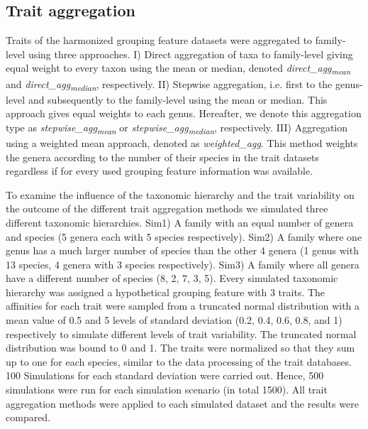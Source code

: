 \documentclass{article}
\begin{document}
\newpage

\subsection*{Trait aggregation}

Traits of the harmonized grouping feature datasets were aggregated to family-level using three approaches. I) Direct aggregation of taxa to family-level giving equal weight to every taxon using the mean or median, denoted \textit{direct\_agg\textsubscript{mean}} and \textit{direct\_agg\textsubscript{median}}, respectively. II) Stepwise aggregation, i.e. first to the genus-level and subsequently to the family-level using the mean or median. This approach gives equal weights to each genus. Hereafter, we denote this aggregation type as \textit{stepwise\_agg\textsubscript{mean}} or \textit{stepwise\_agg\textsubscript{median}}, respectively. III) Aggregation using a weighted mean approach, denoted as \textit{weighted\_agg}. This method weights the genera according to the number of their species in the trait datasets regardless if for every used grouping feature information was available. 

To examine the influence of the taxonomic hierarchy and the trait variability on the outcome of the different trait aggregation methods we simulated three different taxonomic hierarchies. 
Sim1) A family with an equal number of genera and species (5 genera each with 5 species respectively).
Sim2) A family where one genus has a much larger number of species than the other 4 genera (1 genus with 13 species, 4 genera with 3 species respectively). 
Sim3) A family where all genera have a different number of species (8, 2, 7, 3, 5).
Every simulated taxonomic hierarchy was assigned a hypothetical grouping feature with 3 traits. The affinities for each trait were sampled from a truncated normal distribution with a mean value of 0.5 and 5 levels of standard deviation (0.2, 0.4, 0.6, 0.8, and 1) respectively to simulate different levels of trait variability. The truncated normal distribution was bound to 0 and 1. The traits were normalized so that they sum up to one for each species, similar to the data processing of the trait databases. 100 Simulations for each standard deviation were carried out. Hence, 
500 simulations were run for each simulation scenario (in total 1500). All trait aggregation methods were applied to each simulated dataset and the results were compared.   
\end{document}
